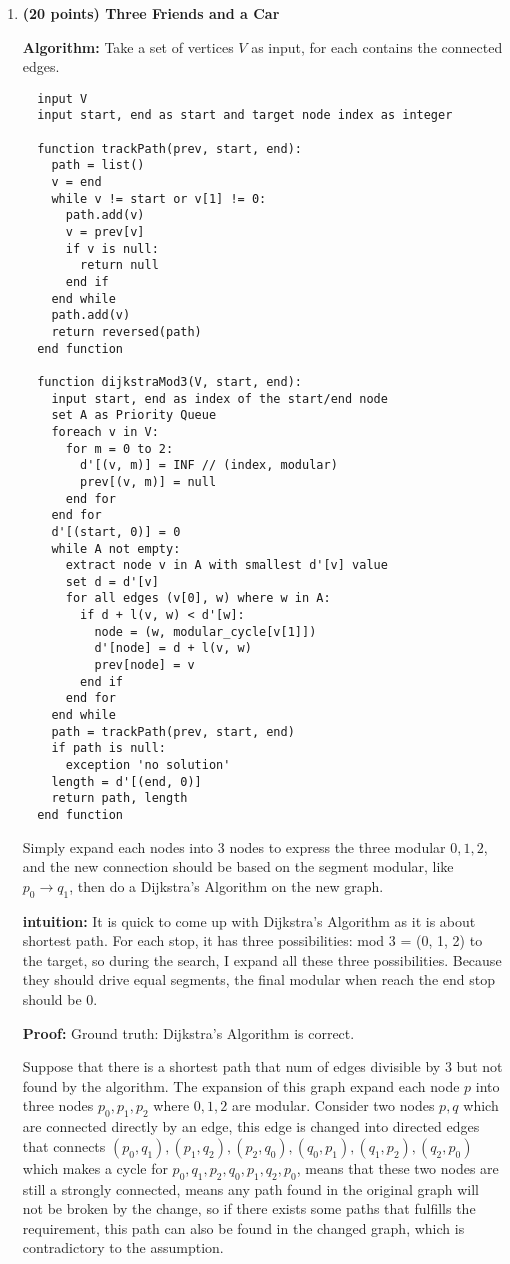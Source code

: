 \documentclass{article}
\begin{document}
\begin{enumerate}[topsep=0pt]
  
\item \textbf{(20 points) Three Friends and a Car}

\textbf{Algorithm:}
Take a set of vertices $V$ as input, for each contains the connected edges.
\begin{verbatim}
  input V
  input start, end as start and target node index as integer

  function trackPath(prev, start, end):
    path = list()
    v = end
    while v != start or v[1] != 0:
      path.add(v)
      v = prev[v]
      if v is null:
        return null
      end if
    end while
    path.add(v)
    return reversed(path)
  end function

  function dijkstraMod3(V, start, end):
    input start, end as index of the start/end node
    set A as Priority Queue
    foreach v in V:
      for m = 0 to 2:
        d'[(v, m)] = INF // (index, modular)
        prev[(v, m)] = null
      end for
    end for
    d'[(start, 0)] = 0
    while A not empty:
      extract node v in A with smallest d'[v] value
      set d = d'[v]
      for all edges (v[0], w) where w in A:
        if d + l(v, w) < d'[w]:
          node = (w, modular_cycle[v[1]])
          d'[node] = d + l(v, w)
          prev[node] = v
        end if
      end for
    end while
    path = trackPath(prev, start, end)
    if path is null:
      exception 'no solution'
    length = d'[(end, 0)]
    return path, length
  end function

\end{verbatim}

Simply expand each nodes into 3 nodes to express the three modular $0,1,2$, and the new connection should be based on the segment modular,
like $p_0\rightarrow q_1$, then do a Dijkstra's Algorithm on the new graph.

\textbf{intuition:}
It is quick to come up with Dijkstra’s Algorithm as it is about shortest path.
For each stop, it has three possibilities: mod 3 = (0, 1, 2) to the target, so during the search, 
I expand all these three possibilities. Because they should drive equal
segments, the final modular when reach the end stop should be 0.

\textbf{Proof:} Ground truth: Dijkstra's Algorithm is correct.

Suppose that there is a shortest path that num of edges divisible by 3 but not found by the algorithm.
The expansion of this graph expand each node $p$ into three nodes $p_0,p_1,p_2$ where $0,1,2$ are modular. 
Consider two nodes $p,q$ which are connected directly by an edge, this edge is changed into directed edges that connects 
$(p_0,q_1),(p_1,q_2),(p_2,q_0),(q_0,p_1),(q_1,p_2),(q_2,p_0)$
which makes a cycle for $p_0,q_1,p_2,q_0,p_1,q_2,p_0$, means that these two nodes are still a strongly connected,
means any path found in the original graph will not be broken by the change, so if there exists some paths that fulfills the requirement,
this path can also be found in the changed graph, which is contradictory to the assumption.


\end{enumerate}
\end{document}
